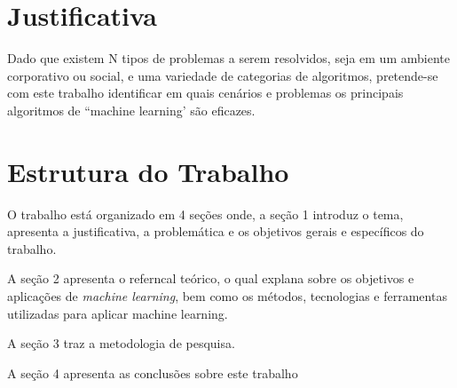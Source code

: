 \section{Justificativa}
\label{sec:justificativa}

Dado que existem N tipos de problemas a serem resolvidos, seja em um ambiente corporativo ou social, 
e uma variedade de categorias de algoritmos, pretende-se com este trabalho identificar em quais 
cenários e problemas os principais algoritmos de “machine learning’ são eficazes.

\section{Estrutura do Trabalho}
\label{sec:estrutura-trabalho}

O trabalho está organizado em 4 seções onde, a seção 1 introduz o tema, apresenta a justificativa, a problemática e os objetivos
gerais e específicos do trabalho.

A seção 2 apresenta o referncal teórico, o qual explana sobre os objetivos e aplicações de  \textit{machine learning}, 
bem como os métodos, tecnologias e ferramentas utilizadas para aplicar machine learning.    	   


A seção 3 traz a metodologia de pesquisa. 


A seção 4 apresenta as conclusões sobre este trabalho
